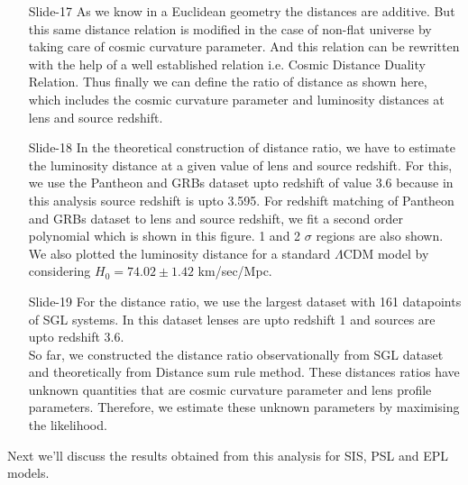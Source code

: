 \documentclass[12pt]{report}
\begin{document}
\begin{itemize}
 \item[\ding{74} Slide-17]
As we know in a Euclidean geometry the distances are additive. But this same distance relation is modified in the case of non-flat universe  by taking care of cosmic curvature parameter. And this relation can be rewritten with the help of a well established relation i.e. Cosmic Distance Duality Relation. Thus finally we can define the ratio of distance as shown here, which includes the cosmic curvature parameter and luminosity distances at lens and source redshift.

 \item[\ding{74} Slide-18]
In the theoretical construction of distance ratio, we have to estimate the luminosity distance at a given value of lens and source redshift. For this, we use the Pantheon and GRBs dataset upto redshift of value 3.6 because in this analysis source redshift is upto 3.595. For redshift matching of Pantheon and GRBs dataset to lens and source redshift, we fit a second order polynomial which is shown in this figure. 1 and 2 $\sigma$ regions are also shown. We also plotted the luminosity distance for a standard $\Lambda$CDM model by considering $H_0=74.02\pm 1.42$ km/sec/Mpc. 

\item[\ding{74} Slide-19]
For the distance ratio, we use the largest dataset with 161 datapoints of SGL systems. In this dataset lenses are upto redshift 1 and sources are upto redshift 3.6. \\
So far, we constructed the distance ratio observationally from SGL dataset and theoretically from Distance sum rule method. These distances ratios have unknown quantities that are cosmic curvature parameter and lens profile parameters. Therefore, we estimate these unknown parameters by maximising the likelihood. 
\end{itemize}
Next we'll discuss the results obtained from this analysis for SIS, PSL and EPL models.
\end{document}
